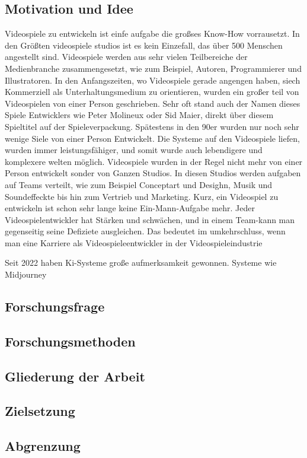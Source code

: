 \documentclass[12pt,a4paper,bibliography=totocnumbered,listof=totocnumbered]{scrartcl}
\begin{document}
\subsection{Motivation und Idee}
Videospiele zu entwickeln ist einfe aufgabe die großses Know-How vorrausetzt. In den Größten videospiele studios ist es kein Einzefall, das über 500 Menschen angestellt sind. Videospiele werden aus sehr vielen Teilbereiche der Medienbranche zusammengesetzt, wie zum Beispiel, Autoren, Programmierer und Illustratoren.
In den Anfangszeiten, wo Videospiele gerade angengen haben, siech Kommerziell als Unterhaltungsmedium zu orientieren, wurden ein großer teil von Videospielen von einer Person geschrieben. Sehr oft stand auch der Namen dieses Spiele Entwicklers wie Peter Molineux oder Sid Maier, direkt über diesem Spieltitel auf der Spieleverpackung.
Spätestens in den 90er wurden nur noch sehr wenige Siele von einer Person Entwickelt. Die Systeme auf den Videospiele liefen, wurden immer leistungsfähiger, und somit wurde auch lebendigere und komplexere welten möglich. Videospiele wurden in der Regel nicht mehr von einer Person entwickelt sonder von Ganzen Studios. In diesen Studios werden aufgaben auf Teams verteilt, wie zum Beispiel Conceptart und Desighn, Musik und Soundeffeckte bis hin zum Vertrieb und Marketing.
Kurz, ein Videospiel zu entwickeln ist schon sehr lange keine Ein-Mann-Aufgabe mehr.
Jeder Videospielentwickler hat Stärken und schwächen, und in einem Team-kann man gegenseitig seine Defiziete ausgleichen. Das bedeutet im umkehrschluss, wenn man eine Karriere als Videospieleentwickler in der Videospieleindustrie

Seit 2022 haben Ki-Systeme große aufmerksamkeit  gewonnen. Systeme wie Midjourney


\subsection{Forschungsfrage}
\subsection{Forschungsmethoden}
\subsection{Gliederung der Arbeit}
\subsection{Zielsetzung}
\subsection{Abgrenzung}
\end{document}
